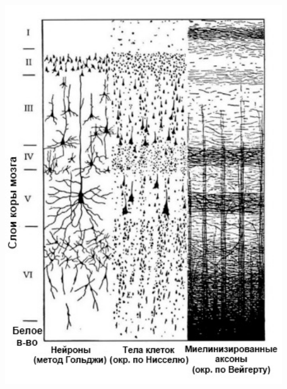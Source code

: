 \documentclass[default]{beamer}
\begin{document}
\begin{frame}
\begin{columns}
\begin{column}{0.5\textwidth}
				\includegraphics[width=0.9\textwidth]{phisio/column_layers_ru}
			\end{column}
		\end{columns}
	\end{frame}
\end{document}
